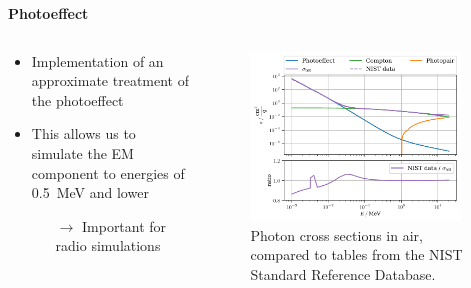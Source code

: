 \documentclass[aspectratio=1610, 9pt]{beamer}
\begin{document}
\begin{frame}

\textbf{Photoeffect}

    \begin{columns}[onlytextwidth]
        \begin{column}{0.45\textwidth}
            \begin{itemize}
              \item Implementation of an approximate treatment of the photoeffect
              \item This allows us to simulate the EM component to energies of \SI{0.5}{\mega\electronvolt} and lower
              \begin{itemize}
                \item[$\rightarrow$] Important for radio simulations
              \end{itemize}
            \end{itemize}
        \end{column}
        \begin{column}{0.55\textwidth}
            \begin{figure}
                \centering
                \includegraphics[width=0.95\textwidth]{plots/photoeffect_nist.pdf}
                \caption{Photon cross sections in air, compared to tables from the NIST Standard Reference Database.}
            \end{figure}
        \end{column}
    \end{columns}
\end{frame}
\end{document}
